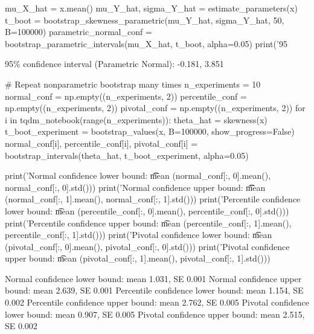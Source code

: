 \begin{python}
mu_X_hat = x.mean()
mu_Y_hat, sigma_Y_hat = estimate_parameters(x)
t_boot = bootstrap_skewness_parametric(mu_Y_hat, sigma_Y_hat, 50, B=100000)
parametric_normal_conf = bootstrap_parametric_intervals(mu_X_hat, t_boot, alpha=0.05)
print('95%
\end{python}
\begin{console}
95\% confidence interval (Parametric Normal):     -0.181, 3.851
\end{console}

\begin{python}
# Repeat nonparametric bootstrap many times
n_experiments = 10
normal_conf = np.empty((n_experiments, 2))
percentile_conf = np.empty((n_experiments, 2))
pivotal_conf = np.empty((n_experiments, 2))
for i in tqdm_notebook(range(n_experiments)):
    theta_hat = skewness(x)
    t_boot_experiment = bootstrap_values(x, B=100000, show_progress=False)
    normal_conf[i], percentile_conf[i], 
                    pivotal_conf[i] = bootstrap_intervals(theta_hat, 
                                                          t_boot_experiment, 
                                                          alpha=0.05)
\end{python}

\begin{python}
print('Normal confidence lower bound: \t\t mean %
      (normal_conf[:, 0].mean(), normal_conf[:, 0].std()))
print('Normal confidence upper bound: \t\t mean %
      (normal_conf[:, 1].mean(), normal_conf[:, 1].std()))
print('Percentile confidence lower bound: \t mean %
      (percentile_conf[:, 0].mean(), percentile_conf[:, 0].std()))
print('Percentile confidence upper bound: \t mean %
      (percentile_conf[:, 1].mean(), percentile_conf[:, 1].std()))
print('Pivotal confidence lower bound: \t mean %
      (pivotal_conf[:, 0].mean(), pivotal_conf[:, 0].std()))
print('Pivotal confidence upper bound: \t mean %
      (pivotal_conf[:, 1].mean(), pivotal_conf[:, 1].std()))
\end{python}
\begin{console}
Normal confidence lower bound:           mean 1.031, SE 0.001
Normal confidence upper bound:           mean 2.639, SE 0.001
Percentile confidence lower bound:       mean 1.154, SE 0.002
Percentile confidence upper bound:       mean 2.762, SE 0.005
Pivotal confidence lower bound:          mean 0.907, SE 0.005
Pivotal confidence upper bound:          mean 2.515, SE 0.002
\end{console}

